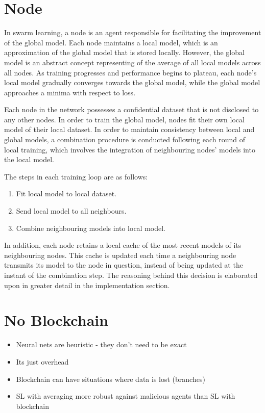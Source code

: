 \section{Node}
In swarm learning, a node is an agent responsible for facilitating the improvement of the global model. Each node maintains a local model, which is an approximation of the global model that is stored locally. However, the global model is an abstract concept representing of the average of all local models across all nodes. As training progresses and performance begins to plateau, each node's local model gradually converges towards the global model, while the global model approaches a minima with respect to loss.

Each node in the network possesses a confidential dataset that is not disclosed to any other nodes. In order to train the global model, nodes fit their own local model of their local dataset. In order to maintain consistency between local and global models, a combination procedure is conducted following each round of local training, which involves the integration of neighbouring nodes' models into the local model.

The steps in each training loop are as follows:
\begin{enumerate}
	\item Fit local model to local dataset.
	\item Send local model to all neighbours.
	\item Combine neighbouring models into local model.
\end{enumerate}

In addition, each node retains a local cache of the most recent models of its neighbouring nodes. This cache is updated each time a neighbouring node transmits its model to the node in question, instead of being updated at the instant of the combination step. The reasoning behind this decision is elaborated upon in greater detail in the implementation section.

\section{No Blockchain}
\begin{itemize}
	\item Neural nets are heuristic - they don't need to be exact
	\item Its just overhead
	\item Blockchain can have situations where data is lost (branches) \checkme
	\item SL with averaging more robust against malicious agents than SL with blockchain  \checkme
\end{itemize}

